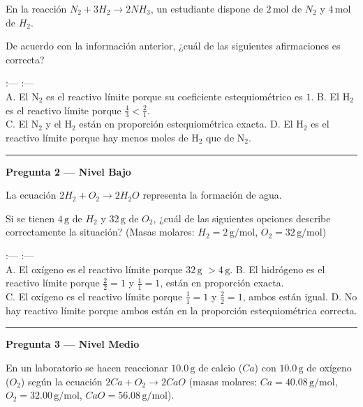 \documentclass[
  spanish,
  letterpaper,
  12pt,
  oneside,
  open=any]{scrbook}
\begin{document}
En la reacción \(N_2 + 3H_2 \rightarrow 2NH_3\), un estudiante dispone
de \(2\,\text{mol}\) de \(N_2\) y \(4\,\text{mol}\) de \(H_2\).

De acuerdo con la información anterior, ¿cuál de las siguientes
afirmaciones es correcta?

:--- \textbar{} :--- \textbar{}\\
A. El N\(_2\) es el reactivo límite porque su coeficiente
estequiométrico es \(1\). \textbar{} B. El H\(_2\) es el reactivo límite
porque \(\frac{4}{3} < \frac{2}{1}\). \textbar{}\\
C. El N\(_2\) y el H\(_2\) están en proporción estequiométrica exacta.
\textbar{} D. El H\(_2\) es el reactivo límite porque hay menos moles de
H\(_2\) que de N\(_2\). \textbar{}

\begin{center}\rule{0.5\linewidth}{0.5pt}\end{center}

\textbf{Pregunta 2 --- Nivel Bajo}

La ecuación \(2H_2 + O_2 \rightarrow 2H_2O\) representa la formación de
agua.

Si se tienen \(4\,\text{g}\) de \(H_2\) y \(32\,\text{g}\) de \(O_2\),
¿cuál de las siguientes opciones describe correctamente la situación?
(Masas molares: \(H_2 = 2\,\text{g/mol}\), \(O_2 = 32\,\text{g/mol}\))

:--- \textbar{} :--- \textbar{}\\
A. El oxígeno es el reactivo límite porque \(32\,\text{g}\)
\(> 4\,\text{g}\). \textbar{} B. El hidrógeno es el reactivo límite
porque \(\frac{2}{2} = 1\) y \(\frac{1}{1} = 1\), están en proporción
exacta. \textbar{}\\
C. El oxígeno es el reactivo límite porque \(\frac{1}{1} = 1\) y
\(\frac{2}{2} = 1\), ambos están igual. \textbar{} D. No hay reactivo
límite porque ambos están en la proporción estequiométrica correcta.
\textbar{}

\begin{center}\rule{0.5\linewidth}{0.5pt}\end{center}

\textbf{Pregunta 3 --- Nivel Medio}

En un laboratorio se hacen reaccionar \(10.0\,\text{g}\) de calcio
(\(Ca\)) con \(10.0\,\text{g}\) de oxígeno (\(O_2\)) según la ecuación
\(2Ca + O_2 \rightarrow 2CaO\) (masas molares:
\(Ca = 40.08\,\text{g/mol}\), \(O_2 = 32.00\,\text{g/mol}\),
\(CaO = 56.08\,\text{g/mol}\)).
\end{document}
